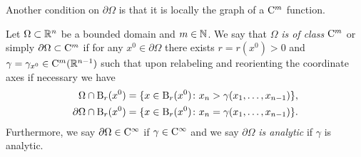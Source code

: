 Another condition on $\partial\Omega$ is that it is locally the graph of a $\mathrm{C}^m$ function.

\begin{defn}
  Let $\Omega \subset \mathbb{R}^n$ be a bounded domain and $m \in \mathbb{N}$.
  We say that $\Omega$ \emph{is of class} $\mathrm{C}^m$ or simply $\partial\Omega \subset \mathrm{C}^m$ if for any $x^0 \in \partial \Omega$ there exists $r = r(x^0) > 0$ and $\gamma = \gamma_{x^0} \in \mathrm{C}^m(\mathbb{R}^{n - 1})$ such that upon relabeling and reorienting the coordinate axes if necessary we have
  \begin{align*}
     \Omega \cap \mathrm{B}_r(x^0) &= \{ x \in \mathrm{B}_r(x^0) \colon x_n > \gamma(x_1,\dots,x_{n - 1}) \}, \\
     \partial \Omega \cap \mathrm{B}_r(x^0) &= \{ x \in \mathrm{B}_r(x^0) \colon x_n = \gamma(x_1,\dots,x_{n - 1})\}.
  \end{align*}
  Furthermore, we say $\partial \Omega \in \mathrm{C}^\infty$ if $\gamma \in \mathrm{C}^\infty$ and we say $\partial \Omega$ \emph{is analytic} if $\gamma$ is analytic.
\end{defn}

